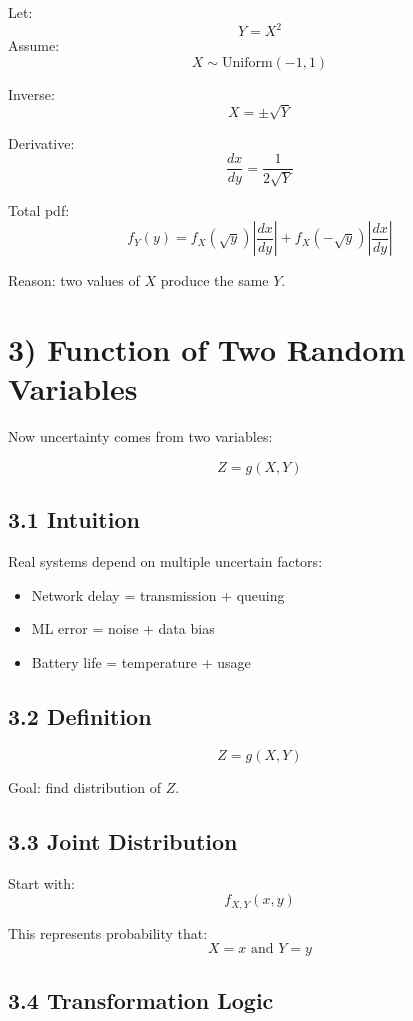 \documentclass[12pt,a4paper]{article}
\begin{document}
Let:
\[
Y = X^2
\]
Assume:
\[
X \sim \text{Uniform}(-1,1)
\]

Inverse:
\[
X = \pm \sqrt{Y}
\]

Derivative:
\[
\frac{dx}{dy} = \frac{1}{2\sqrt{Y}}
\]

Total pdf:
\[
f_Y(y) = f_X(\sqrt{y})\left|\frac{dx}{dy}\right|
+ f_X(-\sqrt{y})\left|\frac{dx}{dy}\right|
\]

Reason: two values of $X$ produce the same $Y$.

\section*{3) Function of Two Random Variables}

Now uncertainty comes from two variables:

\[
Z = g(X,Y)
\]

\subsection*{3.1 Intuition}

Real systems depend on multiple uncertain factors:

\begin{itemize}
\item Network delay = transmission + queuing
\item ML error = noise + data bias
\item Battery life = temperature + usage
\end{itemize}

\subsection*{3.2 Definition}

\[
Z = g(X,Y)
\]

Goal: find distribution of $Z$.

\subsection*{3.3 Joint Distribution}

Start with:
\[
f_{X,Y}(x,y)
\]

This represents probability that:
\[
X=x \text{ and } Y=y
\]

\subsection*{3.4 Transformation Logic}
\end{document}
